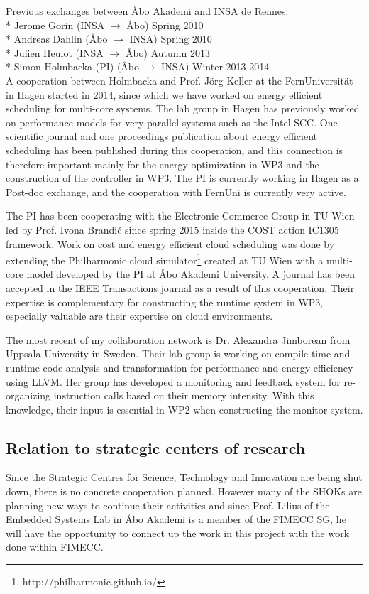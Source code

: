 \documentclass{article}
\begin{document}
Previous exchanges between \AA{}bo Akademi and INSA de Rennes:\\
* Jerome Gorin (INSA $\longrightarrow$ \AA{}bo) Spring 2010\\
* Andreas Dahlin (\AA{}bo $\longrightarrow$ INSA) Spring 2010\\
* Julien Heulot (INSA $\longrightarrow$ \AA{}bo) Autumn 2013\\
* Simon Holmbacka (PI) (\AA{}bo $\longrightarrow$ INSA) Winter 2013-2014\\

A cooperation between Holmbacka and Prof. J\"{o}rg Keller at the FernUniversit\"{a}t in Hagen started in 2014, since which we have worked on energy efficient scheduling for multi-core systems. 
The lab group in Hagen has previously worked on performance models for very parallel systems such as the Intel SCC.
One scientific journal and one proceedings publication about energy efficient scheduling has been published during this cooperation,
and this connection is therefore important mainly for the energy optimization in WP3 and the construction of the controller in WP3.
The PI is currently working in Hagen as a Post-doc exchange, and the cooperation with FernUni is currently very active.

The PI has been cooperating with the Electronic Commerce Group in TU Wien led by Prof. Ivona Brandi\'{c} since spring 2015 inside the COST action IC1305 framework. 
Work on cost and energy efficient cloud scheduling was done by extending the Philharmonic cloud simulator\footnote{http://philharmonic.github.io/} created at TU Wien with a multi-core model developed by the PI at \AA{}bo Akademi University. 
A journal has been accepted in the IEEE Transactions journal as a result of this cooperation.
Their expertise is complementary for constructing the runtime system in WP3, especially valuable are their expertise on cloud environments. 

The most recent of my collaboration network is Dr. Alexandra Jimborean from Uppsala University in Sweden.
Their lab group is working on compile-time and runtime code analysis and transformation for performance and energy efficiency using LLVM.
Her group has developed a monitoring and feedback system for re-organizing instruction calls based on their memory intensity.
With this knowledge, their input is essential in WP2 when constructing the monitor system.


\subsection{Relation to strategic centers of research}
Since the Strategic Centres for Science, Technology and Innovation are being shut down, there is no concrete cooperation planned. 
However many of the SHOKs are planning new ways to continue their activities and since Prof. Lilius of the Embedded Systems Lab in \AA{}bo Akademi is a member of the FIMECC SG, 
he will have the opportunity to connect up the work in this project with the work done within FIMECC.
\end{document}
